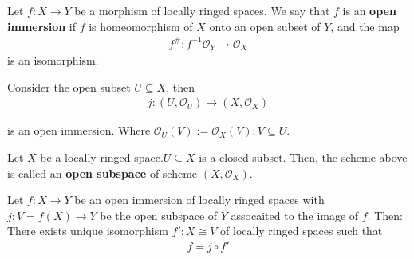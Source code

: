 \documentclass[Total.tex]{subfiles}
\begin{document}
				\begin{Def}
					Let $f:X\rightarrow Y$ be a morphism of locally ringed spaces. We say that $f$ is an \textbf{open immersion} if $f$ is  homeomorphism of $X$ onto an open subset of $Y$, and the map
					\begin{gather*}
						f^\#:f^{-1}\mathcal{O}_Y\rightarrow \mathcal{O}_X
					\end{gather*}
					is an isomorphism.
				\end{Def}
				\begin{example}
					Consider the open subset $U\subseteq X$, then 
					\begin{gather*}
						j:(U,\mathcal{O}_U)\rightarrow (X,\mathcal{O}_X)
					\end{gather*}
					
					is an open immersion. Where $\mathcal{O}_U(V):=\mathcal{O}_X(V);V\subseteq U$.
				\end{example}
				\begin{Def}
					Let $X$ be a locally ringed space.$U\subseteq X$ is a closed subset. Then, the scheme above is called an \textbf{open subspace} of scheme $(X,\mathcal{O}_X)$.
				\end{Def}
				\begin{lemma}
					Let $f:X\rightarrow Y$ be an open immersion of locally ringed spaces with $j:V=f(X)\rightarrow Y$ be the open subspace of $Y$ assocaited to the image of $f$. Then: There exists unique isomorphism $f':X\cong V$ of locally ringed spaces such that
					\begin{gather*}
						f=j\circ f'
					\end{gather*}
				\end{lemma}
\end{document}
